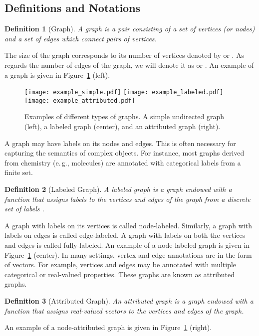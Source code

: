 \documentclass[twoside,11pt]{article}
\newcommand{\eg}{e.\,g., }
\newtheorem{definition}{Definition}
\begin{document}
\subsection{Definitions and Notations}
\begin{definition}[Graph]
    A graph is a pair  consisting of a set of vertices (or nodes)  and a set of edges  which connect pairs of vertices. 
\end{definition}
The size of the graph corresponds to its number of vertices denoted by  or .
As regards the number of edges of the graph, we will denote it as  or .
An example of a graph is given in Figure~\ref{fig:example_graphs} (left).
\begin{figure}[t]
    \centering
    \subfloat
    {\texttt{[image: example\_simple.pdf]}} \qquad \qquad
    \subfloat
    {\texttt{[image: example\_labeled.pdf]}} \qquad \qquad
    \subfloat
    {\texttt{[image: example\_attributed.pdf]}} 
    \caption{Examples of different types of graphs. A simple undirected graph (left), a labeled graph (center), and an attributed graph (right).}
    \label{fig:example_graphs}
\end{figure}
A graph may have labels on its nodes and edges.
This is often necessary for capturing the semantics of complex objects.
For instance, most graphs derived from chemistry (\eg molecules) are annotated with categorical labels from a finite set.
\begin{definition}[Labeled Graph]
    A labeled graph is a graph  endowed with a function  that assigns labels to the vertices and edges of the graph from a discrete set of labels .
\end{definition}
A graph with labels on its vertices is called node-labeled.
Similarly, a graph with labels on edges is called edge-labeled. 
A graph with labels on both the vertices and edges is called fully-labeled.
An example of a node-labeled graph is given in Figure~\ref{fig:example_graphs} (center).
In many settings, vertex and edge annotations are in the form of vectors.
For example, vertices and edges may be annotated with multiple categorical or real-valued properties.
These graphs are known as attributed graphs.
\begin{definition}[Attributed Graph]
    An attributed graph is a graph  endowed with a function  that assigns real-valued vectors to the vertices and edges of the graph.
\end{definition}
An example of a node-attributed graph is given in Figure~\ref{fig:example_graphs} (right).
\end{document}
